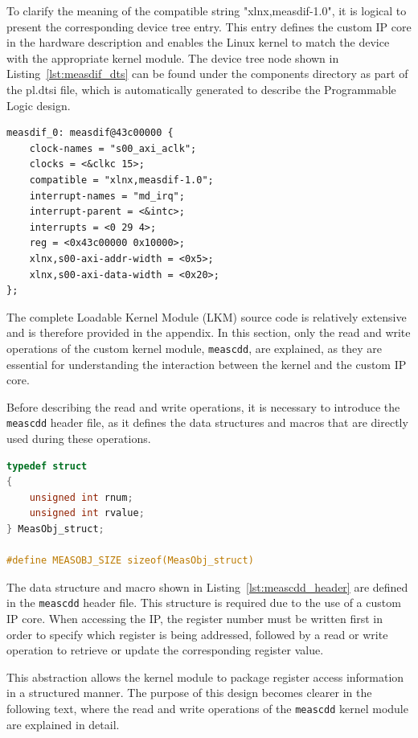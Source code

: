 \documentclass{article}
\begin{document}
To clarify the meaning of the compatible string "xlnx,measdif-1.0", it is logical 
to present the corresponding device tree entry. This entry defines the custom IP 
core in the hardware description and enables the Linux kernel to match the device 
with the appropriate kernel module. The device tree node shown in 
Listing~\ref{lst:measdif_dts} can be found under the components directory as 
part of the pl.dtsi file, which is automatically generated to describe the 
Programmable Logic design.

\begin{lstlisting}[caption={MNG Payload structure}, label={lst:measdif_dts}]
measdif_0: measdif@43c00000 {
    clock-names = "s00_axi_aclk";
    clocks = <&clkc 15>;
    compatible = "xlnx,measdif-1.0";
    interrupt-names = "md_irq";
    interrupt-parent = <&intc>;
    interrupts = <0 29 4>;
    reg = <0x43c00000 0x10000>;
    xlnx,s00-axi-addr-width = <0x5>;
    xlnx,s00-axi-data-width = <0x20>;
};
\end{lstlisting}


The complete Loadable Kernel Module (LKM) source code is relatively extensive 
and is therefore provided in the appendix. In this section, only the read and 
write operations of the custom kernel module, \texttt{meascdd}, are explained, 
as they are essential for understanding the interaction between the kernel and 
the custom IP core.

Before describing the read and write operations, it is necessary to introduce 
the \texttt{meascdd} header file, as it defines the data structures and macros 
that are directly used during these operations.

\begin{lstlisting}[language=C,
caption={Data structure and macro definitions in the meascdd header file},
label={lst:meascdd_header}]
typedef struct 
{
    unsigned int rnum;
    unsigned int rvalue;
} MeasObj_struct;

#define MEASOBJ_SIZE sizeof(MeasObj_struct)
\end{lstlisting}

The data structure and macro shown in Listing~\ref{lst:meascdd_header} are defined 
in the \texttt{meascdd} header file. This structure is required due to the use 
of a custom IP core. When accessing the IP, the register number must be written 
first in order to specify which register is being addressed, followed by a read 
or write operation to retrieve or update the corresponding register value.

This abstraction allows the kernel module to package register access information 
in a structured manner. The purpose of this design becomes clearer in the 
following text, where the read and write operations of the \texttt{meascdd} 
kernel module are explained in detail.
\end{document}
